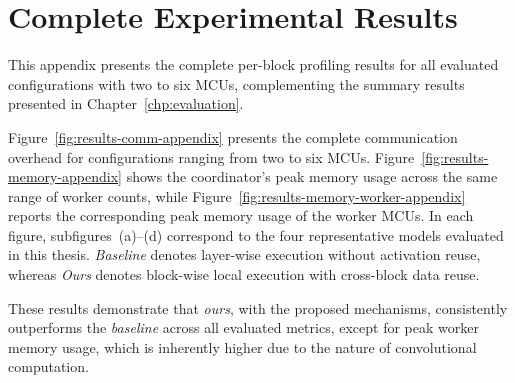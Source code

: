 \chapter{Complete Experimental Results}
\label{app:appendix_a}

This appendix presents the complete per-block profiling results for all evaluated configurations with two to six MCUs, complementing the summary results presented in Chapter~\ref{chp:evaluation}.

Figure~\ref{fig:results-comm-appendix} presents the complete communication overhead for configurations ranging from two to six MCUs. Figure~\ref{fig:results-memory-appendix} shows the coordinator's peak memory usage across the same range of worker counts, while Figure~\ref{fig:results-memory-worker-appendix} reports the corresponding peak memory usage of the worker MCUs.
In each figure, subfigures~(a)--(d) correspond to the four representative models evaluated in this thesis. \emph{Baseline} denotes layer-wise execution without activation reuse, whereas \emph{Ours} denotes block-wise local execution with cross-block data reuse.

These results demonstrate that \emph{ours}, with the proposed mechanisms, consistently outperforms the \emph{baseline} across all evaluated metrics, except for peak worker memory usage, which is inherently higher due to the nature of convolutional computation.

